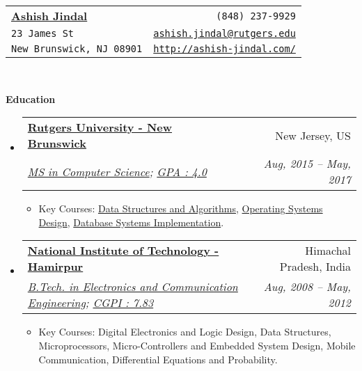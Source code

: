 \documentclass[letterpaper,11pt]{article}
\makeatletter
\newcommand{\resitem}[1]{\item #1 \vspace{-2pt}}
\newcommand{\resheading}[1]{{\large \colorbox{mygrey}{\begin{minipage}{\textwidth}{\textbf{#1 \vphantom{p\^{E}}}}\end{minipage}}}}
\newcommand{\ressubheading}[4]{
\begin{tabular*}{6.5in}{l@{\extracolsep{\fill}}r}
		\textbf{#1} & #2 \\
		\textit{#3} & \textit{#4} \\
\end{tabular*}\vspace{-6pt}}
\makeatother
\begin{document}
\newcommand{\mywebheader}{
\begin{tabular*}{7in}{l@{\extracolsep{\fill}}r}
	\textbf{\href{http://www.ashish-jindal.com/}{\LARGE Ashish Jindal}} & {\footnotesize \texttt{(848) 237-9929}}\\
	{\footnotesize \texttt{23 James St}} & {\footnotesize \texttt{\href{mailto:ashish.jindal@rutgers.edu}{ashish.jindal@rutgers.edu}}}\\
	 {\footnotesize \texttt{New Brunswick, NJ 08901}} & {\footnotesize \texttt{\href{http://www.ashish-jindal.com/}{http://ashish-jindal.com/}}} \\
	\end{tabular*}
\\
\vspace{0.1in}}

\mywebheader

\resheading{Education}
	\begin{itemize}
		\item
			\ressubheading{\href{http://www.rutgers.edu/}{Rutgers University - New Brunswick}}{New Jersey, US}{\href{https://www.cs.rutgers.edu/}{MS in Computer Science}; \href{http://www.ashish-jindal.com/rutgers_unofficial_transcript.pdf}{GPA : 4.0}}{Aug, 2015 -- May, 2017}
				{ \footnotesize
				\begin{itemize}
					\resitem{Key Courses: \href{https://www.cs.rutgers.edu/graduate/courses/512/}{Data Structures and Algorithms}, \href{https://www.cs.rutgers.edu/graduate/courses/518/}{Operating Systems Design}, \href{https://www.cs.rutgers.edu/graduate/courses/539/}{Database Systems Implementation}.}
				\end{itemize}
				}
	\end{itemize}
	
	\begin{itemize}
		\item
			\ressubheading{\href{http://www.nith.ac.in/}{National Institute of Technology - Hamirpur}}{Himachal Pradesh, India}{\href{http://www.nith.ac.in/ece/}{B.Tech. in Electronics and Communication Engineering}; \href{http://www.ashish-jindal.com/nith_unofficial_transcript.pdf}{CGPI : 7.83}}{Aug, 2008 -- May, 2012}
				{ \footnotesize
				\begin{itemize}
					\resitem{Key Courses: Digital Electronics and Logic Design, Data Structures, Microprocessors, Micro-Controllers and Embedded System Design, Mobile Communication, Differential Equations and Probability.}
					
				\end{itemize}
				}
	\end{itemize} %
\end{document}
